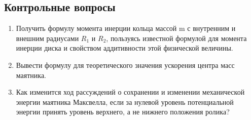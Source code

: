 \documentclass[a4paper, 12pt]{extarticle}
\begin{document}
\subsection{Контрольные вопросы}
\begin{enumerate}
\item Получить формулу момента инерции кольца массой m с внутренним и внешним радиусами $R_1$ и $R_2$, пользуясь известной формулой для момента инерции диска и свойством аддитивности этой физической величины.
\item Вывести формулу для теоретического значения  ускорения центра масс маятника.
\item Как изменится ход рассуждений о сохранении и изменении механической энергии маятника Максвелла, если за нулевой уровень потенциальной энергии принять уровень верхнего, а не нижнего положения ролика?
\end{enumerate}
\end{document}
